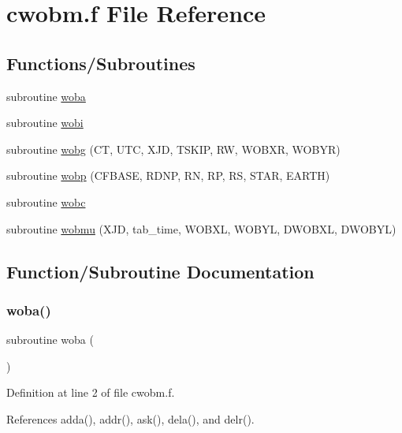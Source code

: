 \hypertarget{cwobm_8f}{}\section{cwobm.\+f File Reference}
\label{cwobm_8f}
\subsection*{Functions/\+Subroutines}
\begin{DoxyCompactItemize}
\item 
subroutine \hyperlink{cwobm_8f_aacae1c1e61106e9632d7f0597f4cd554}{woba}
\item 
subroutine \hyperlink{cwobm_8f_a884da2eee8f670063f8d0f9b0af2f23e}{wobi}
\item 
subroutine \hyperlink{cwobm_8f_a507aa03e4bee0f97b26c64a5797a6fba}{wobg} (CT, U\+TC, X\+JD, T\+S\+K\+IP, RW, W\+O\+B\+XR, W\+O\+B\+YR)
\item 
subroutine \hyperlink{cwobm_8f_ae034435772bd0a7b80581f40da45021e}{wobp} (C\+F\+B\+A\+SE, R\+D\+NP, RN, RP, RS, S\+T\+AR, E\+A\+R\+TH)
\item 
subroutine \hyperlink{cwobm_8f_a7d18c3ee22b833ad83b211801fc812ce}{wobc}
\item 
subroutine \hyperlink{cwobm_8f_a310295a03dba5cfe2a39af134f165466}{wobmu} (X\+JD, tab\+\_\+time, W\+O\+B\+XL, W\+O\+B\+YL, D\+W\+O\+B\+XL, D\+W\+O\+B\+YL)
\end{DoxyCompactItemize}


\subsection{Function/\+Subroutine Documentation}
\mbox{\label{cwobm_8f_aacae1c1e61106e9632d7f0597f4cd554}} 
\subsubsection{\texorpdfstring{woba()}{woba()}}
{\footnotesize\ttfamily subroutine woba (\begin{DoxyParamCaption}{ }\end{DoxyParamCaption})}



Definition at line 2 of file cwobm.\+f.



References adda(), addr(), ask(), dela(), and delr().



